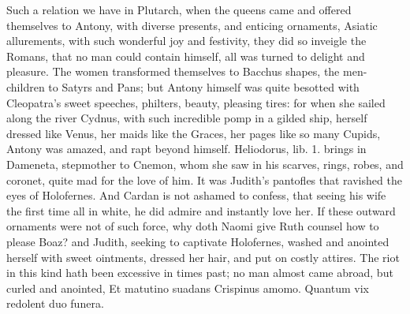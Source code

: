 Such a relation we have in Plutarch, when the queens came and
offered themselves to Antony, with diverse presents, and enticing
ornaments, Asiatic allurements, with such wonderful joy and festivity,
they did so inveigle the Romans, that no man could contain himself, all
was turned to delight and pleasure. The women transformed themselves to
Bacchus shapes, the men-children to Satyrs and Pans; but Antony himself
was quite besotted with Cleopatra's sweet speeches, philters, beauty,
pleasing tires: for when she sailed along the river Cydnus, with such
incredible pomp in a gilded ship, herself dressed like Venus, her maids
like the Graces, her pages like so many Cupids, Antony was amazed, and
rapt beyond himself. Heliodorus, lib. 1. brings in Dameneta, stepmother
to Cnemon, whom she saw in his scarves, rings, robes, and
coronet, quite mad for the love of him. It was Judith's pantofles that
ravished the eyes of Holofernes. And Cardan is not ashamed to
confess, that seeing his wife the first time all in white, he did
admire and instantly love her. If these outward ornaments were not of
such force, why doth Naomi give Ruth counsel how to please Boaz?
and Judith, seeking to captivate Holofernes, washed and anointed
herself with sweet ointments, dressed her hair, and put on costly
attires. The riot in this kind hath been excessive in times past; no
man almost came abroad, but curled and anointed,
Et matutino suadans Crispinus amomo.
Quantum vix redolent duo funera.

